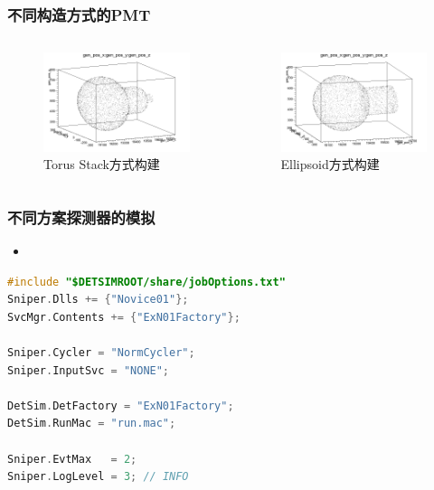 \begin{frame}
    \frametitle{不同构造方式的PMT}
    \begin{columns}
        \column{6.0cm}
        \begin{figure}
            \includegraphics[width=6cm,keepaspectratio]{data/torusstack_PMT.png}
            \caption{Torus Stack方式构建}
        \end{figure}
        \column{6.0cm}
        \begin{figure}
            \includegraphics[width=6cm,keepaspectratio]{data/ellipsoid_PMT.png}
            \caption{Ellipsoid方式构建}
        \end{figure}
    \end{columns}
\end{frame}


\begin{frame}
    \frametitle{不同方案探测器的模拟}
    \begin{itemize}
        \item
    \end{itemize}
\end{frame}

\newsavebox{\NoviceJobOptions}
\begin{lrbox}{\NoviceJobOptions}
\begin{lstlisting}[language=c++]
#include "$DETSIMROOT/share/jobOptions.txt"
Sniper.Dlls += {"Novice01"};
SvcMgr.Contents += {"ExN01Factory"};

Sniper.Cycler = "NormCycler";
Sniper.InputSvc = "NONE";

DetSim.DetFactory = "ExN01Factory";
DetSim.RunMac = "run.mac";

Sniper.EvtMax   = 2;
Sniper.LogLevel = 3; // INFO
\end{lstlisting}
\end{lrbox}



